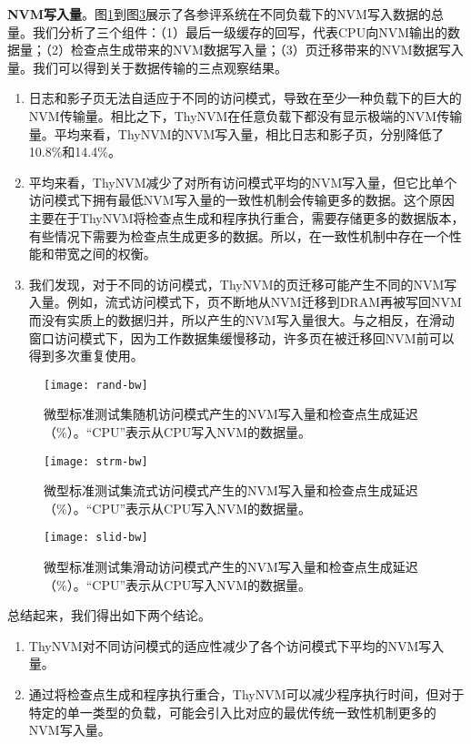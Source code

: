 \textbf{NVM写入量}。图\ref{fig:rand-bw}到图\ref{fig:slid-bw}展示了各参评系统在不同负载下的NVM写入数据的总量。我们分析了三个组件：（1）最后一级缓存的回写，代表CPU向NVM输出的数据量；（2）检查点生成带来的NVM数据写入量；（3）页迁移带来的NVM数据写入量。我们可以得到关于数据传输的三点观察结果。
\begin{enumerate}
\item 日志和影子页无法自适应于不同的访问模式，导致在至少一种负载下的巨大的NVM传输量。相比之下，ThyNVM在任意负载下都没有显示极端的NVM传输量。平均来看，ThyNVM的NVM写入量，相比日志和影子页，分别降低了10.8\%和14.4\%。
\item 平均来看，ThyNVM减少了对所有访问模式平均的NVM写入量，但它比单个访问模式下拥有最低NVM写入量的一致性机制会传输更多的数据。这个原因主要在于ThyNVM将检查点生成和程序执行重合，需要存储更多的数据版本，有些情况下需要为检查点生成更多的数据。所以，在一致性机制中存在一个性能和带宽之间的权衡。
\item 我们发现，对于不同的访问模式，ThyNVM的页迁移可能产生不同的NVM写入量。例如，流式访问模式下，页不断地从NVM迁移到DRAM再被写回NVM而没有实质上的数据归并，所以产生的NVM写入量很大。与之相反，在滑动窗口访问模式下，因为工作数据集缓慢移动，许多页在被迁移回NVM前可以得到多次重复使用。 
\end{enumerate}

\begin{figure}[!h]
\centering
\texttt{[image: rand-bw]}\\
\caption{微型标准测试集随机访问模式产生的NVM写入量和检查点生成延迟（\%）。``CPU''表示从CPU写入NVM的数据量。}
\label{fig:rand-bw}
\end{figure}

\begin{figure}[!h]
\centering
\texttt{[image: strm-bw]}\\
\caption{微型标准测试集流式访问模式产生的NVM写入量和检查点生成延迟（\%）。``CPU''表示从CPU写入NVM的数据量。}
\label{fig:strm-bw}
\end{figure}

\begin{figure}[!h]
\centering
\texttt{[image: slid-bw]}\\
\caption{微型标准测试集滑动访问模式产生的NVM写入量和检查点生成延迟（\%）。``CPU''表示从CPU写入NVM的数据量。}
\label{fig:slid-bw}
\end{figure}

总结起来，我们得出如下两个结论。
\begin{enumerate}
\item ThyNVM对不同访问模式的适应性减少了各个访问模式下平均的NVM写入量。 
\item 通过将检查点生成和程序执行重合，ThyNVM可以减少程序执行时间，但对于特定的单一类型的负载，可能会引入比对应的最优传统一致性机制更多的NVM写入量。
\end{enumerate}

